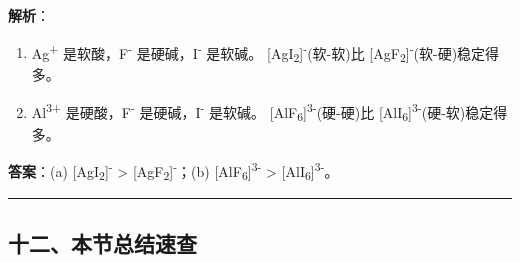 \documentclass[a4paper,11pt]{ctexart}
\begin{document}
\textbf{解析}：

\begin{enumerate}
\def\labelenumi{(\alph{enumi})}
\item
  Ag\textsuperscript{+} 是软酸，F\textsuperscript{-} 是硬碱，I\textsuperscript{-} 是软碱。
  {[}AgI\textsubscript{2}{]}\textsuperscript{-}(软-软)比 {[}AgF\textsubscript{2}{]}\textsuperscript{-}(软-硬)稳定得多。
\item
  Al\textsuperscript{3+} 是硬酸，F\textsuperscript{-} 是硬碱，I\textsuperscript{-} 是软碱。
  {[}AlF\textsubscript{6}{]}\textsuperscript{3-}(硬-硬)比 {[}AlI\textsubscript{6}{]}\textsuperscript{3-}(硬-软)稳定得多。
\end{enumerate}

\textbf{答案}：(a) {[}AgI\textsubscript{2}{]}\textsuperscript{-} \textgreater{} {[}AgF\textsubscript{2}{]}\textsuperscript{-}；(b) {[}AlF\textsubscript{6}{]}\textsuperscript{3-} \textgreater{} {[}AlI\textsubscript{6}{]}\textsuperscript{3-}。

\begin{center}\rule{0.5\linewidth}{0.5pt}\end{center}

\subsection{十二、本节总结速查}\label{ux5341ux4e8cux672cux8282ux603bux7ed3ux901fux67e5}
\end{document}
